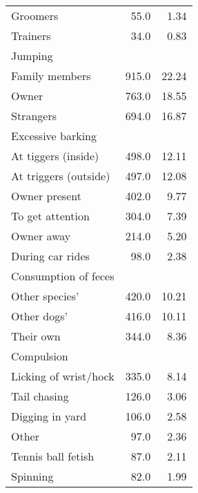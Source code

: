 \documentclass[varwidth=\maxdimen]{standalone}
\newcommand{\subrow}[1]{\hspace{1.25em}#1}
\begin{document}
\begin{tabular}[t]{lrr}
  \subrow{Groomers}                            &       55.0 &            1.34 \\
  \subrow{Trainers}                            &       34.0 &            0.83 \\
Jumping \\
  \subrow{Family members}                      &      915.0 &           22.24 \\
  \subrow{Owner}                               &      763.0 &           18.55 \\
  \subrow{Strangers}                           &      694.0 &           16.87 \\
Excessive barking \\
  \subrow{At tiggers (inside)}                 &      498.0 &           12.11 \\
  \subrow{At triggers (outside)}               &      497.0 &           12.08 \\
  \subrow{Owner present}                       &      402.0 &            9.77 \\
  \subrow{To get attention}                    &      304.0 &            7.39 \\
  \subrow{Owner away}                          &      214.0 &            5.20 \\
  \subrow{During car rides}                    &       98.0 &            2.38 \\
Consumption of feces \\
  \subrow{Other species'}                      &      420.0 &           10.21 \\
  \subrow{Other dogs'}                         &      416.0 &           10.11 \\
  \subrow{Their own}                           &      344.0 &            8.36 \\
Compulsion \\
  \subrow{Licking of wrist/hock}               &      335.0 &            8.14 \\
  \subrow{Tail chasing}                        &      126.0 &            3.06 \\
  \subrow{Digging in yard}                     &      106.0 &            2.58 \\
  \subrow{Other}                               &       97.0 &            2.36 \\
  \subrow{Tennis ball fetish}                  &       87.0 &            2.11 \\
  \subrow{Spinning}                            &       82.0 &            1.99 \\

\end{tabular}
\end{document}
